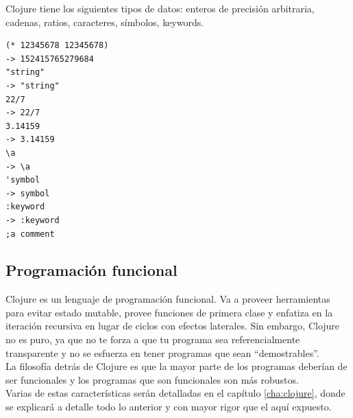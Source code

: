 Clojure tiene los siguientes tipos de datos: enteros de precisión
arbitraria, cadenas, ratios, caracteres, símbolos, keywords.

\begin{verbatim}
(* 12345678 12345678)
-> 152415765279684
"string"
-> "string"
22/7
-> 22/7
3.14159
-> 3.14159
\a
-> \a
'symbol
-> symbol
:keyword
-> :keyword
;a comment
\end{verbatim}

\subsection{Programación funcional}

Clojure es un lenguaje de programación funcional. Va a proveer
herramientas para evitar estado mutable, provee funciones de primera
clase y enfatiza en la iteración recursiva en lugar de ciclos con
efectos laterales. Sin embargo, Clojure no es puro, ya que no te forza
a que tu programa sea referencialmente transparente y no se esfuerza
en tener programas que sean ``demostrables''.\\

La filosofía detrás de Clojure es que la mayor parte de los programas
deberían de ser funcionales y los programas que son funcionales son
más robustos.\\

Varias de estas características serán detalladas en el capítulo
\ref{cha:clojure}, donde se explicará a detalle todo lo anterior y con
mayor rigor que el aquí expuesto.